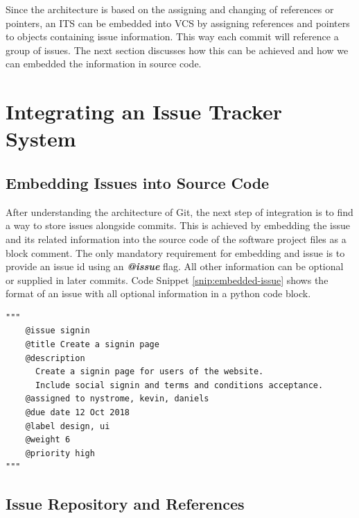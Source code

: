 \documentclass{mproj}
\newenvironment{code}{\captionsetup{type=listing}}{}
\begin{document}
Since the architecture is based on the assigning and changing of references or pointers, an ITS can be embedded into VCS by assigning references and pointers to objects containing issue information. This way each commit will reference a group of issues. The next section discusses how this can be achieved and how we can embedded the information in source code.





\section{Integrating an Issue Tracker System}


\subsection{Embedding Issues into Source Code}

After understanding the architecture of Git, the next step of integration is to find a way to store issues alongside commits. This is achieved by embedding the issue and its related information into the source code of the software project files as a block comment. The only mandatory requirement for embedding and issue is to provide an issue id using an \textbf{\textit{@issue}} flag. All other information can be optional or supplied in later commits. Code Snippet \ref{snip:embedded-issue} shows the format of an issue with all optional information in a python code block.

\begin{code}
\label{snip:embedded-issue}
\begin{verbatim}
"""
    @issue signin
    @title Create a signin page
    @description
      Create a signin page for users of the website. 
      Include social signin and terms and conditions acceptance.
    @assigned to nystrome, kevin, daniels
    @due date 12 Oct 2018
    @label design, ui
    @weight 6
    @priority high    
"""
\end{verbatim}
\end{code}




\subsection{Issue Repository and References}
\end{document}
